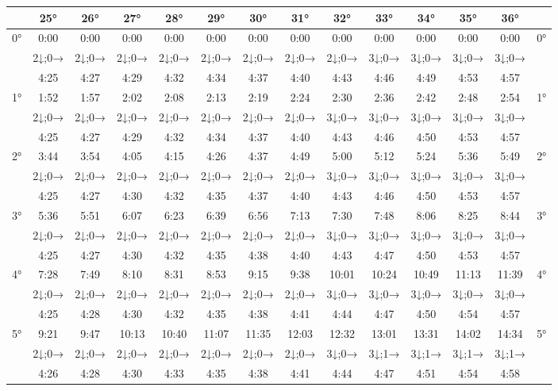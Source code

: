 \begin{scriptsize}\begin{tabular}{c || c | c | c | c | c | c | c | c | c | c | c | c || c}
		\space &25°&26°&27°&28°&29°&30°&31°&32°&33°&34°&35°&36°\\\hline\hline
		\multirow{3}{*}{0°}&0:00&0:00&0:00&0:00&0:00&0:00&0:00&0:00&0:00&0:00&0:00&0:00&\multirow{3}{*}{0°}\\ \space&2↓;0→&2↓;0→&2↓;0→&2↓;0→&2↓;0→&2↓;0→&2↓;0→&2↓;0→&3↓;0→&3↓;0→&3↓;0→&3↓;0→&\space\\&4:25&4:27&4:29&4:32&4:34&4:37&4:40&4:43&4:46&4:49&4:53&4:57&\space\\\hline
		\multirow{3}{*}{1°}&1:52&1:57&2:02&2:08&2:13&2:19&2:24&2:30&2:36&2:42&2:48&2:54&\multirow{3}{*}{1°}\\ \space&2↓;0→&2↓;0→&2↓;0→&2↓;0→&2↓;0→&2↓;0→&2↓;0→&3↓;0→&3↓;0→&3↓;0→&3↓;0→&3↓;0→&\space\\&4:25&4:27&4:29&4:32&4:34&4:37&4:40&4:43&4:46&4:50&4:53&4:57&\space\\\hline
		\multirow{3}{*}{2°}&3:44&3:54&4:05&4:15&4:26&4:37&4:49&5:00&5:12&5:24&5:36&5:49&\multirow{3}{*}{2°}\\ \space&2↓;0→&2↓;0→&2↓;0→&2↓;0→&2↓;0→&2↓;0→&2↓;0→&3↓;0→&3↓;0→&3↓;0→&3↓;0→&3↓;0→&\space\\&4:25&4:27&4:30&4:32&4:35&4:37&4:40&4:43&4:46&4:50&4:53&4:57&\space\\\hline
		\multirow{3}{*}{3°}&5:36&5:51&6:07&6:23&6:39&6:56&7:13&7:30&7:48&8:06&8:25&8:44&\multirow{3}{*}{3°}\\ \space&2↓;0→&2↓;0→&2↓;0→&2↓;0→&2↓;0→&2↓;0→&2↓;0→&3↓;0→&3↓;0→&3↓;0→&3↓;0→&3↓;0→&\space\\&4:25&4:27&4:30&4:32&4:35&4:38&4:40&4:43&4:47&4:50&4:53&4:57&\space\\\hline
		\multirow{3}{*}{4°}&7:28&7:49&8:10&8:31&8:53&9:15&9:38&10:01&10:24&10:49&11:13&11:39&\multirow{3}{*}{4°}\\ \space&2↓;0→&2↓;0→&2↓;0→&2↓;0→&2↓;0→&2↓;0→&2↓;0→&3↓;0→&3↓;0→&3↓;0→&3↓;0→&3↓;0→&\space\\&4:25&4:28&4:30&4:32&4:35&4:38&4:41&4:44&4:47&4:50&4:54&4:57&\space\\\hline
		\multirow{3}{*}{5°}&9:21&9:47&10:13&10:40&11:07&11:35&12:03&12:32&13:01&13:31&14:02&14:34&\multirow{3}{*}{5°}\\ \space&2↓;0→&2↓;0→&2↓;0→&2↓;0→&2↓;0→&2↓;0→&2↓;0→&3↓;0→&3↓;1→&3↓;1→&3↓;1→&3↓;1→&\space\\&4:26&4:28&4:30&4:33&4:35&4:38&4:41&4:44&4:47&4:51&4:54&4:58&\space\\\hline

\end{tabular}
\end{scriptsize}
